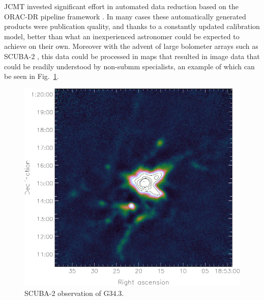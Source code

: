\documentclass[final,authoryear,5p,times,twocolumn]{elsarticle}
\newcommand*\figref[1]{Fig.~\ref{#1}}
\begin{document}
JCMT invested significant effort in automated data reduction based on
the ORAC-DR pipeline framework
\citep[][]{1999ASPC..172...11E,1999ASPC..172..171J,2005ASPC..347..585G,2008ASPC..394..565J,2015A&C.....9...40J}. In
many cases these automatically generated products were publication
quality, and thanks to a constantly updated calibration model, better
than what an inexperienced astronomer could be expected to achieve on
their own. Moreover with the advent of large bolometer arrays such as
SCUBA-2 \citep{2013MNRAS.430.2513H}, this data could be processed in
maps that resulted in image data that could be readily understood by
non-submm specialists, an example of which can be seen in \figref{fig:g34}.

\begin{figure}[t]
\includegraphics[width=\columnwidth]{g34}
\caption{SCUBA-2 observation of G34.3.}
\label{fig:g34}
\end{figure}
\end{document}

